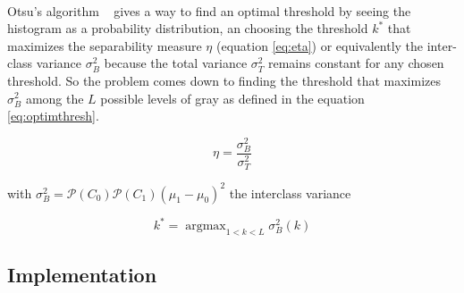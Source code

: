 \documentclass[a4paper,10pt]{article}
\DeclareMathOperator*{\argmax}{argmax}
\begin{document}
\paragraph{} Otsu's algorithm ~\cite{Otsu1979}
gives a way to find an optimal threshold by seeing the histogram as a probability distribution, an choosing the threshold $k^*$ that maximizes the separability measure $\eta$ (equation \ref{eq:eta}) or equivalently the inter-class variance $\sigma_B^2$ because the total variance $\sigma_T^2$ remains constant for any chosen threshold. So the problem comes down to finding the threshold that maximizes $\sigma_B^2$ among the $L$ possible levels of gray as defined in the equation \ref{eq:optimthresh}. 

\begin{equation} \label{eq:eta}
\eta=\frac{\sigma_B^2}{\sigma_T^2} 
\end{equation}

with $ \sigma_B^2=\mathcal{P}(C_0)\mathcal{P}(C_1)(\mu_1-\mu_0)^2$ the interclass variance

\begin{equation} \label{eq:optimthresh}
  k^* = \argmax_{1<k<L} \sigma_B^2(k)   
\end{equation}

\subsection{Implementation}
\end{document}
